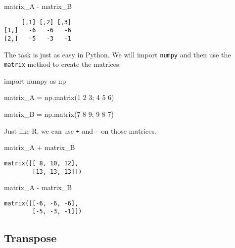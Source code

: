\documentclass[
]{krantz}
\newenvironment{Shaded}{\begin{snugshade}}{\end{snugshade}}
\newcommand{\ImportTok}[1]{\textcolor[rgb]{0.00,0.46,0.62}{#1}}
\newcommand{\NormalTok}[1]{\textcolor[rgb]{0.00,0.23,0.31}{#1}}
\newcommand{\OperatorTok}[1]{\textcolor[rgb]{0.37,0.37,0.37}{#1}}
\newcommand{\SpecialCharTok}[1]{\textcolor[rgb]{0.37,0.37,0.37}{#1}}
\newcommand{\StringTok}[1]{\textcolor[rgb]{0.13,0.47,0.30}{#1}}
\begin{document}
\begin{Shaded}
\begin{Highlighting}[]
\NormalTok{matrix\_A }\SpecialCharTok{{-}}\NormalTok{ matrix\_B}
\end{Highlighting}
\end{Shaded}

\begin{verbatim}
     [,1] [,2] [,3]
[1,]   -6   -6   -6
[2,]   -5   -3   -1
\end{verbatim}

The task is just as easy in Python. We will import \texttt{numpy} and
then use the \texttt{matrix} method to create the matrices:

\begin{Shaded}
\begin{Highlighting}[]
\ImportTok{import}\NormalTok{ numpy }\ImportTok{as}\NormalTok{ np}

\NormalTok{matrix\_A }\OperatorTok{=}\NormalTok{ np.matrix(}\StringTok{\textquotesingle{}1 2 3; 4 5 6\textquotesingle{}}\NormalTok{)}

\NormalTok{matrix\_B }\OperatorTok{=}\NormalTok{ np.matrix(}\StringTok{\textquotesingle{}7 8 9; 9 8 7\textquotesingle{}}\NormalTok{)}
\end{Highlighting}
\end{Shaded}

Just like R, we can use \texttt{+} and \texttt{-} on those matrices.

\begin{Shaded}
\begin{Highlighting}[]
\NormalTok{matrix\_A }\OperatorTok{+}\NormalTok{ matrix\_B}
\end{Highlighting}
\end{Shaded}

\begin{verbatim}
matrix([[ 8, 10, 12],
        [13, 13, 13]])
\end{verbatim}

\begin{Shaded}
\begin{Highlighting}[]
\NormalTok{matrix\_A }\OperatorTok{{-}}\NormalTok{ matrix\_B}
\end{Highlighting}
\end{Shaded}

\begin{verbatim}
matrix([[-6, -6, -6],
        [-5, -3, -1]])
\end{verbatim}

\hypertarget{transpose}{%
\subsection{Transpose}\label{transpose}}
\end{document}
